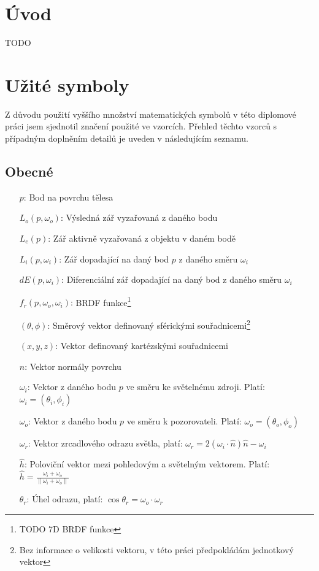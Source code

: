 \documentclass[czech,master]{diploma}
\newcommand{\uvec}[1]{\hat{#1}}
\newcommand{\point}{p}
\newcommand{\brdf}{f_r\left(\point,\omega_{o},\omega_{i}\right)}
\newcommand{\normVec}{\uvec{n}}
\newcommand{\inVec}{\omega_{i}}
\newcommand{\outVec}{\omega_{o}}
\newcommand{\refl}{\omega_{r}}
\newcommand{\halfVec}{\uvec{h}}
\newcommand{\outRadiance}{L_o\left(\point,\outVec\right)}
\newcommand{\inRadiance}{L_i\left(\point,\inVec\right)}
\newcommand{\emitRadiance}{L_e\left(\point\right)}
\newcommand{\irradiance}{dE\left(\point,\inVec\right)}
\begin{document}
\MakeTitlePages

\chapter{Úvod}
TODO


\clearpage
\chapter{Užité symboly}
Z důvodu použití vyššího množství matematických symbolů v této diplomové práci jsem sjednotil značení použité ve vzorcích. Přehled těchto vzorců s případným doplněním detailů je uveden v následujícím seznamu.
\section{Obecné}
\begin{itemize}
  \item[\(p\):] Bod na povrchu tělesa
  \item[\(\outRadiance\):] Výsledná zář vyzařovaná z daného bodu
  \item[\(\emitRadiance\):] Zář aktivně vyzařovaná z objektu v daném bodě
  \item[\(\inRadiance\):] Zář dopadající na daný bod \(p\) z daného směru \(\inVec\)
  \item[\(\irradiance\):] Diferenciální zář dopadající na daný bod z daného směru \(\inVec\)
  \item[\(\brdf\):] BRDF funkce\footnote{TODO 7D BRDF funkce}
  \item[\(\left(\theta,\phi\right)\):] Směrový vektor definovaný sférickými souřadnicemi\footnote{Bez informace o velikosti vektoru, v této práci předpokládám jednotkový vektor}
  \item[\(\left(x,y,z\right)\):] Vektor definovaný kartézskými souřadnicemi
  \item[\(\normVec\):] Vektor normály povrchu
  \item[\(\inVec\):] Vektor z daného bodu \(p\) ve směru ke světelnému zdroji. Platí: \(\inVec = \left(\theta_i,\phi_i\right)\)
  \item[\(\outVec\):] Vektor z daného bodu \(p\) ve směru k pozorovateli. Platí: \(\outVec = \left(\theta_o,\phi_o\right)\)
  \item[\(\refl\):] Vektor zrcadlového odrazu světla, platí: \(\refl = 2\left(\inVec\cdot\normVec\right)\normVec-\inVec\)
  \item[\(\halfVec\):] Poloviční vektor mezi pohledovým a světelným vektorem. Platí: \(\halfVec = \frac{\inVec + \outVec}{\| \inVec + \outVec\|}\)
  \item[\(\theta_r\):] Úhel odrazu, platí: \(\cos\theta_r = \outVec\cdot\refl\)
\end{itemize}
\end{document}
